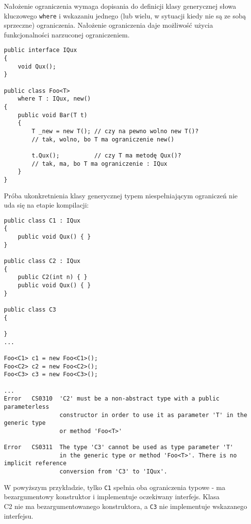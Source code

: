 Nałożenie ograniczenia wymaga dopisania do definicji klasy generycznej słowa kluczowego {\tt where} i wskazaniu jednego 
(lub wielu, w sytuacji kiedy nie są ze sobą sprzeczne) ograniczenia. Nałożenie ograniczenia daje możliwość użycia
funkcjonalności narzuconej ograniczeniem.

\begin{scriptsize}
\begin{verbatim}
public interface IQux
{
    void Qux();
}

public class Foo<T>
    where T : IQux, new()
{
    public void Bar(T t)
    {
        T _new = new T(); // czy na pewno wolno new T()?
        // tak, wolno, bo T ma ograniczenie new()

        t.Qux();          // czy T ma metodę Qux()?
        // tak, ma, bo T ma ograniczenie : IQux
    }
}
\end{verbatim}
\end{scriptsize}

Próba ukonkretnienia klasy generycznej typem niespełniającym ograniczeń nie uda się na etapie kompilacji:

\begin{scriptsize}
\begin{verbatim}
public class C1 : IQux
{
    public void Qux() { }
}

public class C2 : IQux
{
    public C2(int n) { }
    public void Qux() { }
}

public class C3
{
    
}
...

Foo<C1> c1 = new Foo<C1>();
Foo<C2> c2 = new Foo<C2>();
Foo<C3> c3 = new Foo<C3>();

...
Error	CS0310	'C2' must be a non-abstract type with a public parameterless 
                constructor in order to use it as parameter 'T' in the generic type 
                or method 'Foo<T>'	

Error	CS0311	The type 'C3' cannot be used as type parameter 'T' 
                in the generic type or method 'Foo<T>'. There is no implicit reference 
                conversion from 'C3' to 'IQux'.	
\end{verbatim}
\end{scriptsize}

W powyższym przykładzie, tylko {\tt C1} spełnia oba ograniczenia typowe - ma bezargumentowy konstruktor i
implementuje oczekiwany interfejs. Klasa {\\ C2} nie ma bezargumentowanego konstruktora, a {\tt C3} nie
implementuje wskazanego interfejsu. 

